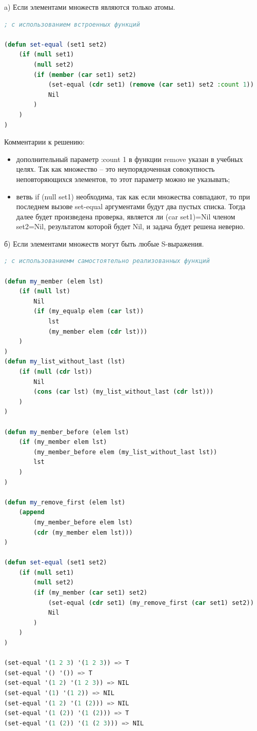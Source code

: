 \documentclass[12pt]{report}
\begin{document}
a) Если элементами множеств являются только атомы.

\begin{lstlisting}[language=Lisp]	
; с использованием встроенных функций

(defun set-equal (set1 set2)
	(if (null set1)  
		(null set2)
		(if (member (car set1) set2) 
			(set-equal (cdr set1) (remove (car set1) set2 :count 1))
			Nil
		)
	)
)
\end{lstlisting}

Комментарии к решению:
\begin{itemize}
	\item дополнительный параметр :count 1 в функции remove указан в учебных целях. Так как множество -- это неупорядоченная совокупность неповторяющихся элементов, то этот параметр можно не указывать;
	\item ветвь if (null set1) необходима, так как если множества совпадают, то при последнем вызове set-equal аргументами будут два пустых списка. Тогда далее будет произведена проверка, является ли (car set1)=Nil членом set2=Nil, результатом которой будет Nil, и задача будет решена неверно.
\end{itemize}


б) Если элементами множеств могут быть любые S-выражения.

\begin{lstlisting}[language=Lisp]	
; с использованиемм самостоятельно реализованных функций

(defun my_member (elem lst)
	(if (null lst)
		Nil
		(if (my_equalp elem (car lst))
			lst
			(my_member elem (cdr lst)))
	)
)
(defun my_list_without_last (lst)
	(if (null (cdr lst))
		Nil
		(cons (car lst) (my_list_without_last (cdr lst)))
	)
)

(defun my_member_before (elem lst)
	(if (my_member elem lst)
		(my_member_before elem (my_list_without_last lst))
		lst
	)
)

(defun my_remove_first (elem lst)
	(append 
		(my_member_before elem lst) 
		(cdr (my_member elem lst)))
)

(defun set-equal (set1 set2)
	(if (null set1)  
		(null set2)
		(if (my_member (car set1) set2) 
			(set-equal (cdr set1) (my_remove_first (car set1) set2))
			Nil
		)
	)
)

(set-equal '(1 2 3) '(1 2 3)) => T
(set-equal '() '()) => T
(set-equal '(1 2) '(1 2 3)) => NIL
(set-equal '(1) '(1 2)) => NIL
(set-equal '(1 2) '(1 (2))) => NIL
(set-equal '(1 (2)) '(1 (2))) => T
(set-equal '(1 (2)) '(1 (2 3))) => NIL
\end{lstlisting}
\end{document}
